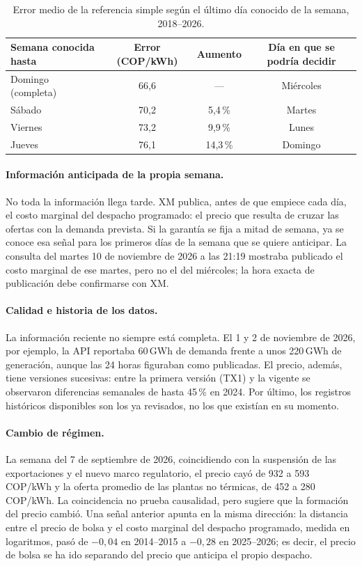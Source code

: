 \documentclass[11pt,letterpaper]{article}
\newcommand{\cop}{\,COP/kWh}
\begin{document}
\begin{table}[H]
\centering
\caption{Error medio de la referencia simple según el último día conocido
de la semana, 2018--2026.}
\label{tab:corte}
\small
\begin{tabular}{@{}lccc@{}}
\toprule
\textbf{Semana conocida hasta} & \textbf{Error (COP/kWh)} &
\textbf{Aumento} & \textbf{Día en que se podría decidir}\\
\midrule
Domingo (completa) & 66,6 & ---       & Miércoles \\
Sábado             & 70,2 & 5,4\,\%   & Martes \\
Viernes            & 73,2 & 9,9\,\%   & Lunes \\
Jueves             & 76,1 & 14,3\,\%  & Domingo \\
\bottomrule
\end{tabular}
\end{table}

\paragraph{Información anticipada de la propia semana.} No toda la
información llega tarde. XM publica, antes de que empiece cada día, el
costo marginal del despacho programado: el precio que resulta de cruzar
las ofertas con la demanda prevista. Si la garantía se fija a mitad de
semana, ya se conoce esa señal para los primeros días de la semana que
se quiere anticipar. La consulta del martes 10 de noviembre de 2026 a las
21:19 mostraba publicado el costo marginal de ese martes, pero no el del
miércoles; la hora exacta de publicación debe confirmarse con XM.

\paragraph{Calidad e historia de los datos.} La información reciente no
siempre está completa. El 1 y 2 de noviembre de 2026, por ejemplo, la
API reportaba 60\,GWh de demanda frente a unos 220\,GWh de generación,
aunque las 24 horas figuraban como publicadas. El precio, además, tiene
versiones sucesivas: entre la primera versión (TX1) y la vigente se
observaron diferencias semanales de hasta 45\,\% en 2024. Por último, los
registros históricos disponibles son los ya revisados, no los que
existían en su momento.

\paragraph{Cambio de régimen.} La semana del 7 de septiembre de 2026,
coincidiendo con la suspensión de las exportaciones y el nuevo marco
regulatorio, el precio cayó de 932 a 593\cop{} y la oferta promedio de
las plantas no térmicas, de 452 a 280\cop. La coincidencia no prueba
causalidad, pero sugiere que la formación del precio cambió. Una señal
anterior apunta en la misma dirección: la distancia entre el precio de
bolsa y el costo marginal del despacho programado, medida en logaritmos,
pasó de $-0{,}04$ en 2014--2015 a $-0{,}28$ en 2025--2026; es decir, el
precio de bolsa se ha ido separando del precio que anticipa el propio
despacho.
\end{document}
